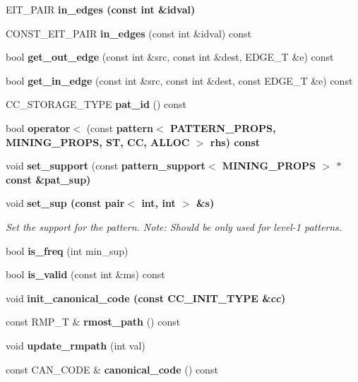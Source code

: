 \begin{CompactItemize}
\item 
EIT\_\-PAIR \bf{in\_\-edges} (const int \&idval)
\item 
CONST\_\-EIT\_\-PAIR \textbf{in\_\-edges} (const int \&idval) const \label{classpattern_029ab839bd4fae751ac59f55a01baae3}

\item 
bool \textbf{get\_\-out\_\-edge} (const int \&src, const int \&dest, EDGE\_\-T \&e) const \label{classpattern_e481b675a03e883a05de4d5f2c4fa062}

\item 
bool \textbf{get\_\-in\_\-edge} (const int \&src, const int \&dest, const EDGE\_\-T \&e) const \label{classpattern_34b10d2c8a8f8f8342fd85020616577b}

\item 
CC\_\-STORAGE\_\-TYPE \textbf{pat\_\-id} () const \label{classpattern_f388cd3b1af1e2d6ee6eb28dd86c9f6c}

\item 
bool \textbf{operator$<$} (const \bf{pattern}$<$ PATTERN\_\-PROPS, MINING\_\-PROPS, ST, CC, ALLOC $>$ rhs) const \label{classpattern_45e1bba8f536825bc7909b1a56b59199}

\item 
void \textbf{set\_\-support} (const \bf{pattern\_\-support}$<$ MINING\_\-PROPS $>$ $\ast$const \&pat\_\-sup)\label{classpattern_6b61effc66f5f6ec1313f8d77cac4103}

\item 
void \bf{set\_\-sup} (const pair$<$ int, int $>$ \&s)
\begin{CompactList}\small\item\em Set the support for the pattern. Note: Should be only used for level-1 patterns. \item\end{CompactList}\item 
bool \textbf{is\_\-freq} (int min\_\-sup)\label{classpattern_cb2d8590853bc6723d17e3d95045f735}

\item 
bool \textbf{is\_\-valid} (const int \&ms) const \label{classpattern_b06afad4aea2e0cd0e61d21afdf09937}

\item 
void \bf{init\_\-canonical\_\-code} (const CC\_\-INIT\_\-TYPE \&cc)
\item 
const RMP\_\-T \& \textbf{rmost\_\-path} () const \label{classpattern_ba6d3ce21d6e1e2ac8094b7994063f1a}

\item 
void \textbf{update\_\-rmpath} (int val)\label{classpattern_8abfc44c2c362bf8334b694e05391264}

\item 
const CAN\_\-CODE \& \textbf{canonical\_\-code} () const \label{classpattern_7204593774d3b8e3ccaf8937547288ea}

\end{CompactItemize}
